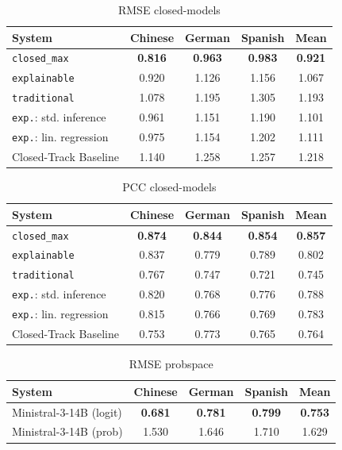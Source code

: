 \begin{table}[t]
\setlength{\tabcolsep}{3.1pt}
\footnotesize
\centering
\begin{tabularx}{\linewidth}{Xcccc}
\toprule
System & Chinese & German & Spanish & Mean \\
\midrule
\texttt{closed\_max} & \textbf{0.816} & \textbf{0.963} & \textbf{0.983} & \textbf{0.921} \\
\texttt{explainable} & 0.920 & 1.126 & 1.156 & 1.067 \\
\texttt{traditional} & 1.078 & 1.195 & 1.305 & 1.193 \\
\midrule
\texttt{exp.}: std. inference & 0.961 & 1.151 & 1.190 & 1.101 \\
\texttt{exp.}: lin. regression & 0.975 & 1.154 & 1.202 & 1.111 \\
\midrule
Closed-Track Baseline & 1.140 & 1.258 & 1.257 & 1.218 \\
\bottomrule
\end{tabularx}
\caption{RMSE closed-models}
\label{tab:rmse-closed-models}
\end{table}

\begin{table}[t]
\setlength{\tabcolsep}{3.1pt}
\footnotesize
\centering
\begin{tabularx}{\linewidth}{Xcccc}
\toprule
System & Chinese & German & Spanish & Mean \\
\midrule
\texttt{closed\_max} & \textbf{0.874} & \textbf{0.844} & \textbf{0.854} & \textbf{0.857} \\
\texttt{explainable} & 0.837 & 0.779 & 0.789 & 0.802 \\
\texttt{traditional} & 0.767 & 0.747 & 0.721 & 0.745 \\
\midrule
\texttt{exp.}: std. inference & 0.820 & 0.768 & 0.776 & 0.788 \\
\texttt{exp.}: lin. regression & 0.815 & 0.766 & 0.769 & 0.783 \\
\midrule
Closed-Track Baseline & 0.753 & 0.773 & 0.765 & 0.764 \\
\bottomrule
\end{tabularx}
\caption{PCC closed-models}
\label{tab:pcc-closed-models}
\end{table}

\begin{table}[t]
\setlength{\tabcolsep}{3.1pt}
\footnotesize
\centering
\begin{tabular}{lcccc}
\toprule
System & Chinese & German & Spanish & Mean \\
\midrule
Ministral-3-14B (logit) & \textbf{0.681} & \textbf{0.781} & \textbf{0.799} & \textbf{0.753} \\
Ministral-3-14B (prob) & 1.530 & 1.646 & 1.710 & 1.629 \\
\bottomrule
\end{tabular}
\caption{RMSE probspace}
\label{tab:rmse-probspace}
\end{table}

